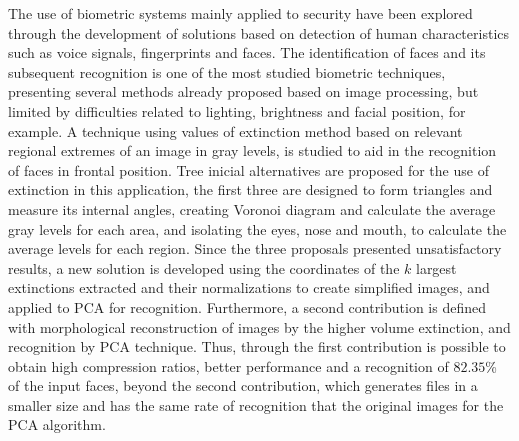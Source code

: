 The use of biometric systems mainly applied to security have been explored through the development of solutions based on detection of human characteristics such as voice signals, fingerprints and faces. The identification of faces and its subsequent recognition is one of the most studied biometric techniques, presenting several methods already proposed based on image processing, but limited by difficulties related to lighting, brightness and facial position, for example. A technique using values of extinction method based on relevant regional extremes of an image in gray levels, is studied to aid in the recognition of faces in frontal position. Tree inicial alternatives are proposed for the use of extinction in this application, the first three are designed to form triangles and measure its internal angles, creating Voronoi diagram and calculate the average gray levels for each area, and isolating the eyes, nose and mouth, to calculate the average levels for each region. Since the three proposals presented unsatisfactory results, a new solution is developed using the coordinates of the $k$ largest extinctions extracted and their normalizations to create simplified images, and applied to PCA for recognition. Furthermore, a second contribution is defined with morphological reconstruction of images by the higher volume extinction, and recognition by PCA technique. Thus, through the first contribution is possible to obtain high compression ratios, better performance and a recognition of $82.35$\% of the input faces, beyond the second contribution, which generates files in a smaller size and has the same rate of recognition that the original images for the PCA algorithm.


